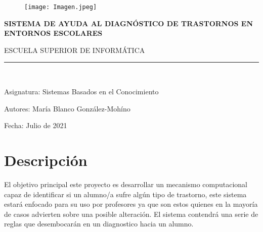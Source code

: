 \documentclass[letterpaper,12pt]{article}
\begin{document}
	
	\begin{titlepage}
		
		\begin{center}
			\vspace*{-1in}
			\begin{figure}[htb]
				\begin{center}
					\texttt{[image: Imagen.jpeg]}
				\end{center}
			\end{figure}
		
			\vspace*{0.15in}
			\begin{Large}
				\begin{center}
					\textbf{SISTEMA DE AYUDA AL DIAGNÓSTICO DE
TRASTORNOS EN ENTORNOS ESCOLARES}
				\end{center}
			\end{Large}
			\vspace*{0.3in}
			\begin{large}
				ESCUELA SUPERIOR DE INFORMÁTICA\\
			\end{large}
			\vspace*{0.3in}
			\rule{150mm}{0.1mm}\\
			\vspace*{0.6in}
			\begin{large}
				\begin{flushleft}
					{\normalsize Asignatura: Sistemas Basados en el Conocimiento}
				\end{flushleft}
				\begin{flushleft}
					{\normalsize Autores: María Blanco González-Mohíno\\} 
				\end{flushleft}
				\begin{flushleft}
					{\normalsize Fecha: Julio de 2021}
				\end{flushleft}
			\end{large}
		\end{center}
		\end{titlepage}
		\tableofcontents
		\newpage
\section{Descripción}
El objetivo principal este proyecto es desarrollar un mecanismo computacional capaz de identificar si un alumno/a sufre algún tipo de trastorno, este sistema estará enfocado para su uso por profesores ya que son estos quienes en la mayoría de casos advierten sobre una posible alteración.
El sistema contendrá una serie de reglas que desembocarán en un diagnostico hacia un alumno.
\end{document}
